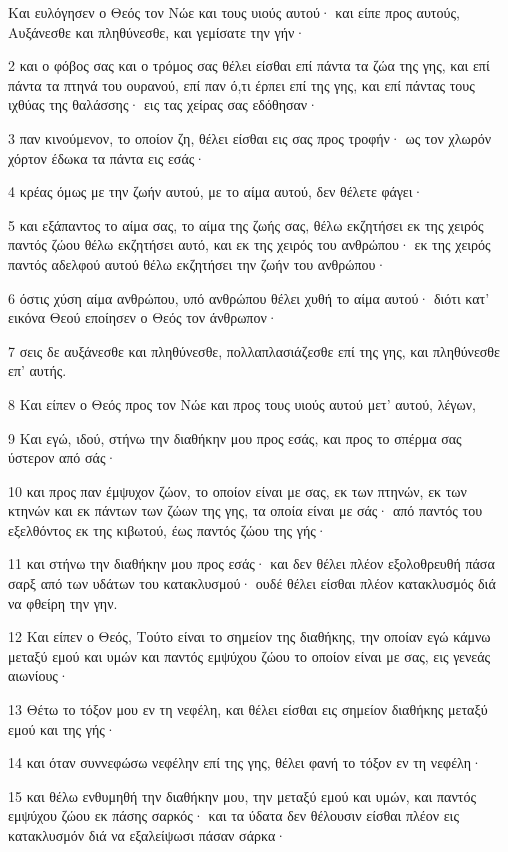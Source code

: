 \par Και ευλόγησεν ο Θεός τον Νώε και τους υιούς αυτού· και είπε προς αυτούς, Αυξάνεσθε και πληθύνεσθε, και γεμίσατε την γήν·
\par 2 και ο φόβος σας και ο τρόμος σας θέλει είσθαι επί πάντα τα ζώα της γης, και επί πάντα τα πτηνά του ουρανού, επί παν ό,τι έρπει επί της γης, και επί πάντας τους ιχθύας της θαλάσσης· εις τας χείρας σας εδόθησαν·
\par 3 παν κινούμενον, το οποίον ζη, θέλει είσθαι εις σας προς τροφήν· ως τον χλωρόν χόρτον έδωκα τα πάντα εις εσάς·
\par 4 κρέας όμως με την ζωήν αυτού, με το αίμα αυτού, δεν θέλετε φάγει·
\par 5 και εξάπαντος το αίμα σας, το αίμα της ζωής σας, θέλω εκζητήσει εκ της χειρός παντός ζώου θέλω εκζητήσει αυτό, και εκ της χειρός του ανθρώπου· εκ της χειρός παντός αδελφού αυτού θέλω εκζητήσει την ζωήν του ανθρώπου·
\par 6 όστις χύση αίμα ανθρώπου, υπό ανθρώπου θέλει χυθή το αίμα αυτού· διότι κατ' εικόνα Θεού εποίησεν ο Θεός τον άνθρωπον·
\par 7 σεις δε αυξάνεσθε και πληθύνεσθε, πολλαπλασιάζεσθε επί της γης, και πληθύνεσθε επ' αυτής.
\par 8 Και είπεν ο Θεός προς τον Νώε και προς τους υιούς αυτού μετ' αυτού, λέγων,
\par 9 Και εγώ, ιδού, στήνω την διαθήκην μου προς εσάς, και προς το σπέρμα σας ύστερον από σάς·
\par 10 και προς παν έμψυχον ζώον, το οποίον είναι με σας, εκ των πτηνών, εκ των κτηνών και εκ πάντων των ζώων της γης, τα οποία είναι με σάς· από παντός του εξελθόντος εκ της κιβωτού, έως παντός ζώου της γής·
\par 11 και στήνω την διαθήκην μου προς εσάς· και δεν θέλει πλέον εξολοθρευθή πάσα σαρξ από των υδάτων του κατακλυσμού· ουδέ θέλει είσθαι πλέον κατακλυσμός διά να φθείρη την γην.
\par 12 Και είπεν ο Θεός, Τούτο είναι το σημείον της διαθήκης, την οποίαν εγώ κάμνω μεταξύ εμού και υμών και παντός εμψύχου ζώου το οποίον είναι με σας, εις γενεάς αιωνίους·
\par 13 Θέτω το τόξον μου εν τη νεφέλη, και θέλει είσθαι εις σημείον διαθήκης μεταξύ εμού και της γής·
\par 14 και όταν συννεφώσω νεφέλην επί της γης, θέλει φανή το τόξον εν τη νεφέλη·
\par 15 και θέλω ενθυμηθή την διαθήκην μου, την μεταξύ εμού και υμών, και παντός εμψύχου ζώου εκ πάσης σαρκός· και τα ύδατα δεν θέλουσιν είσθαι πλέον εις κατακλυσμόν διά να εξαλείψωσι πάσαν σάρκα·
